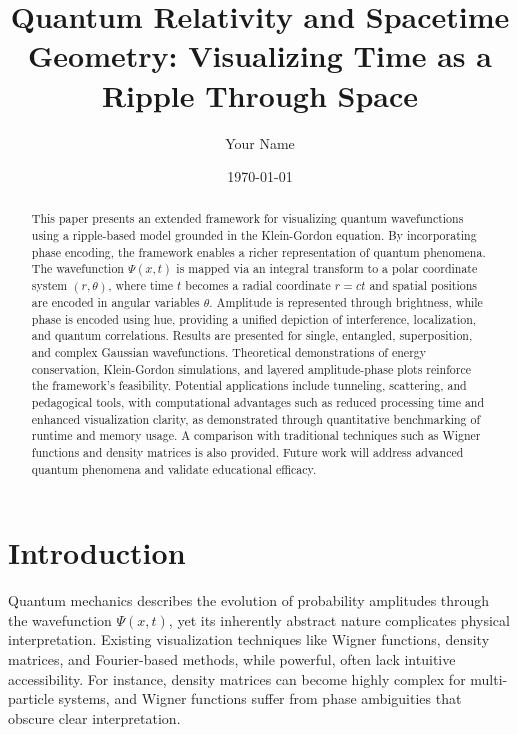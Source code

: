 \documentclass[12pt]{article}
\title{Quantum Relativity and Spacetime Geometry: Visualizing Time as a Ripple Through Space}
\author{Your Name}
\date{\today}
\begin{document}
\maketitle

\begin{abstract}
This paper presents an extended framework for visualizing quantum wavefunctions using a ripple-based model grounded in the Klein-Gordon equation. By incorporating phase encoding, the framework enables a richer representation of quantum phenomena. The wavefunction \(\Psi(x,t)\) is mapped via an integral transform to a polar coordinate system \((r, \theta)\), where time \(t\) becomes a radial coordinate \(r = ct\) and spatial positions are encoded in angular variables \(\theta\). Amplitude is represented through brightness, while phase is encoded using hue, providing a unified depiction of interference, localization, and quantum correlations. Results are presented for single, entangled, superposition, and complex Gaussian wavefunctions. Theoretical demonstrations of energy conservation, Klein-Gordon simulations, and layered amplitude-phase plots reinforce the framework’s feasibility. Potential applications include tunneling, scattering, and pedagogical tools, with computational advantages such as reduced processing time and enhanced visualization clarity, as demonstrated through quantitative benchmarking of runtime and memory usage. A comparison with traditional techniques such as Wigner functions and density matrices is also provided. Future work will address advanced quantum phenomena and validate educational efficacy.
\end{abstract}

\tableofcontents

\section{Introduction}
Quantum mechanics describes the evolution of probability amplitudes through the wavefunction \(\Psi(x,t)\), yet its inherently abstract nature complicates physical interpretation. Existing visualization techniques like Wigner functions, density matrices, and Fourier-based methods, while powerful, often lack intuitive accessibility. For instance, density matrices can become highly complex for multi-particle systems, and Wigner functions suffer from phase ambiguities that obscure clear interpretation.
\end{document}
